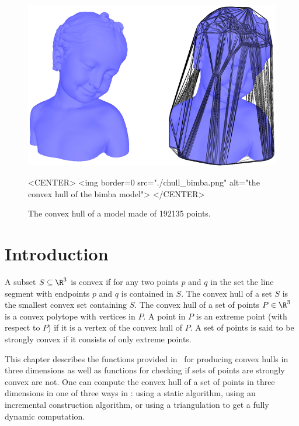 \begin{figure}
\begin{ccTexOnly}
\begin{center}
\includegraphics[width=12cm]{Convex_hull_3/chull_bimba.png}
\end{center}
\end{ccTexOnly}
\begin{ccHtmlOnly}
<CENTER>
<img border=0 src="./chull_bimba.png" alt="the convex hull of the bimba model">
</CENTER>
\end{ccHtmlOnly}
\caption{The convex hull of a model made of 192135 points.
\label{fig-ch-bimba}}
\end{figure}

\section{Introduction}

A subset $S \subseteq \R^3$ is convex if for any two points $p$ and $q$
in the set the line segment with endpoints $p$ and $q$ is contained
in $S$. The convex hull of a set $S$ 
is the smallest convex set containing
$S$. The convex hull of a set of points $P \in \R^3$ is a convex 
polytope with vertices in $P$. A point in $P$ is an extreme point 
(with respect to $P$) if it is a vertex of 
the convex hull of $P$.  A set of points is said to be strongly convex %
 if it consists of only extreme points.

This chapter describes the functions provided in
\cgal\ for producing convex hulls in three dimensions as well as
functions for checking if sets of points are strongly convex are not.  
One can compute the convex hull of a set of points in three dimensions
in one of three ways in \cgal: using a static algorithm,
using an incremental construction algorithm, or using a
triangulation to get a fully dynamic computation.

